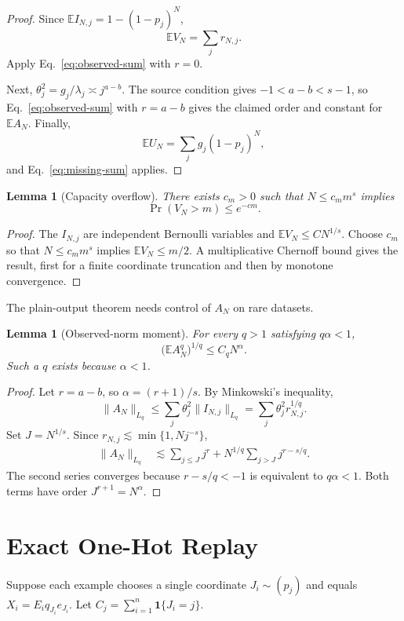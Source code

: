 \documentclass[letterpaper]{article}
\newtheorem{lemma}[theorem]{Lemma}
\newcommand{\E}{\mathbb E}
\newcommand{\1}{\mathbf 1}
\begin{document}
\begin{proof}
Since $\E I_{N,j}=1-(1-p_j)^N$,
\[
\E V_N=\sum_jr_{N,j}.
\]
Apply Eq.~\eqref{eq:observed-sum} with $r=0$.

Next,
$\theta_j^2=g_j/\lambda_j\asymp j^{a-b}$. The source condition gives
$-1<a-b<s-1$, so Eq.~\eqref{eq:observed-sum} with $r=a-b$ gives the claimed
order and constant for $\E A_N$. Finally,
\[
\E U_N=\sum_jg_j(1-p_j)^N,
\]
and Eq.~\eqref{eq:missing-sum} applies.
\end{proof}

\begin{lemma}[Capacity overflow]
\label{lem:capacity-overflow}
There exists $c_m>0$ such that $N\le c_mm^s$ implies
\[
\Pr(V_N>m)\le e^{-cm}.
\]
\end{lemma}

\begin{proof}
The $I_{N,j}$ are independent Bernoulli variables and
$\E V_N\le C N^{1/s}$. Choose $c_m$ so that $N\le c_mm^s$ implies
$\E V_N\le m/2$. A multiplicative Chernoff bound gives the result, first for a
finite coordinate truncation and then by monotone convergence.
\end{proof}

The plain-output theorem needs control of $A_N$ on rare datasets.

\begin{lemma}[Observed-norm moment]
\label{lem:AN-moment}
For every $q>1$ satisfying $q\alpha<1$,
\[
\bigl(\E A_N^q\bigr)^{1/q}\le C_qN^\alpha.
\]
Such a $q$ exists because $\alpha<1$.
\end{lemma}

\begin{proof}
Let $r=a-b$, so $\alpha=(r+1)/s$. By Minkowski's inequality,
\[
\|A_N\|_{L_q}
\le\sum_j\theta_j^2\|I_{N,j}\|_{L_q}
=\sum_j\theta_j^2r_{N,j}^{1/q}.
\]
Set $J=N^{1/s}$. Since $r_{N,j}\lesssim\min\{1,Nj^{-s}\}$,
\begin{align*}
\|A_N\|_{L_q}
&\lesssim
\sum_{j\le J}j^r
+N^{1/q}\sum_{j>J}j^{r-s/q}.
\end{align*}
The second series converges because
$r-s/q<-1$ is equivalent to $q\alpha<1$. Both terms have order
$J^{r+1}=N^\alpha$.
\end{proof}

\section{Exact One-Hot Replay}

Suppose each example chooses a single coordinate $J_i\sim(p_j)$ and equals
$X_i=E_iq_{J_i}e_{J_i}$. Let
$C_j=\sum_{i=1}^n\1\{J_i=j\}$.
\end{document}
